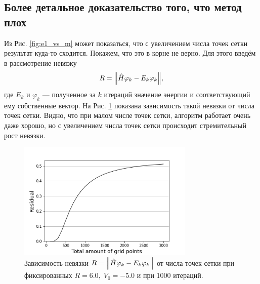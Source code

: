 \documentclass[10pt]{article}
\begin{document}
\subsection{Более детальное доказательство того, что метод плох}
Из Рис. \ref{fig:e1_vs_m} может показаться, что с увеличением числа точек сетки результат куда-то сходится. Покажем, что это в корне не верно. Для этого введём в рассмотрение невязку
$$
R = \norm{\hat H \varphi_k - E_k \varphi_k},
$$
где $E_k$ и $\varphi_k$ --- полученное за $k$ итераций значение энергии и соответствующий ему собственные вектор. На Рис. \ref{fig:r_vs_m} показана зависимость такой невязки от числа точек сетки. Видно, что при малом числе точек сетки, алгоритм работает очень даже хорошо, но с увеличением числа точек сетки происходит стремительный рост невязки.
\begin{figure}[htbp]
 \centering
 \includegraphics[width=0.75\textwidth]{../figures/r_vs_m}
 \caption{Зависимость невязки $R = \norm{\hat H \varphi_k - E_k \varphi_k}$ от числа точек сетки при фиксированных $R=6.0,\; V_0 = -5.0$ и при 1000 итераций.}
 \label{fig:r_vs_m}
\end{figure}
\end{document}
